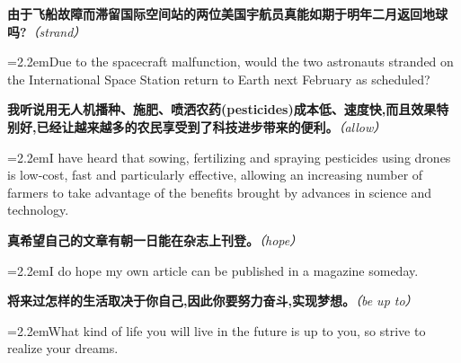 \documentclass[11pt,a4paper]{article}
\newcommand{\num}[1]{\makebox[1.9em][r]{#1.}\hspace{0.3em}}
\newcommand{\prompt}[1]{\emph{\textcolor{tipblue}{\small（#1）}}}
\begin{document}
\begin{minipage}{\linewidth}

\num{23}\textbf{由于飞船故障而滞留国际空间站的两位美国宇航员真能如期于明年二月返回地球吗?}\prompt{strand}

\vspace{0.15em}

\noindent\hangindent=2.2em\hspace{2.2em}Due to the spacecraft malfunction, would the two astronauts stranded on the International Space Station return to Earth next February as scheduled?

\end{minipage}

\begin{minipage}{\linewidth}

\num{24}\textbf{我听说用无人机播种、施肥、喷洒农药(pesticides)成本低、速度快,而且效果特别好,已经让越来越多的农民享受到了科技进步带来的便利。}\prompt{allow}

\vspace{0.15em}

\noindent\hangindent=2.2em\hspace{2.2em}I have heard that sowing, fertilizing and spraying pesticides using drones is low-cost, fast and particularly effective, allowing an increasing number of farmers to take advantage of the benefits brought by advances in science and technology.

\end{minipage}

\vspace{0.35em}\vspace{0.15em}

\begin{minipage}{\linewidth}

\num{25}\textbf{真希望自己的文章有朝一日能在杂志上刊登。}\prompt{hope}

\vspace{0.15em}

\noindent\hangindent=2.2em\hspace{2.2em}I do hope my own article can be published in a magazine someday.

\end{minipage}

\begin{minipage}{\linewidth}

\num{26}\textbf{将来过怎样的生活取决于你自己,因此你要努力奋斗,实现梦想。}\prompt{be up to}

\vspace{0.15em}

\noindent\hangindent=2.2em\hspace{2.2em}What kind of life you will live in the future is up to you, so strive to realize your dreams.

\end{minipage}
\end{document}

